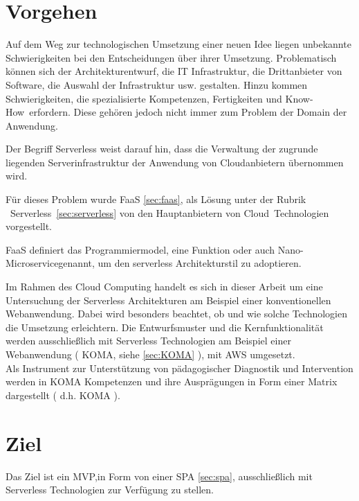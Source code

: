 \documentclass[
12pt,
english,
ngerman,
headsepline,
twoside,
openright,
numbers=noenddot,version=first
]{scrreprt}
\begin{document}
\section{Vorgehen}
Auf dem Weg zur technologischen Umsetzung einer neuen Idee liegen unbekannte Schwierigkeiten
bei den Entscheidungen über ihrer Umsetzung. Problematisch können sich der Architekturentwurf, die IT Infrastruktur, die Drittanbieter von Software, die Auswahl der Infrastruktur usw. gestalten. Hinzu kommen Schwierigkeiten, die spezialisierte Kompetenzen, Fertigkeiten und \glqq Know-How\grqq\ erfordern. Diese gehören jedoch nicht immer zum Problem der Domain der Anwendung.

Der Begriff Serverless weist darauf hin, dass die Verwaltung der zugrunde liegenden Serverinfrastruktur der Anwendung von Cloudanbietern übernommen wird. 

Für dieses Problem wurde \acrfull{FaaS} \autoref{sec:faas}, als Lösung unter der Rubrik \glqq\ Serverless\grqq\ \autoref{sec:serverless} von den Hauptanbietern von \glqq Cloud\grqq\ Technologien vorgestellt.

\acrshort{FaaS} definiert das Programmiermodel, eine Funktion oder auch \glqq Nano-Microservice\grqq genannt, um den serverless Architekturstil zu adoptieren.

Im Rahmen des Cloud Computing handelt es sich in dieser Arbeit um eine Untersuchung der Serverless Architekturen am Beispiel einer konventionellen Webanwendung. Dabei wird besonders beachtet, ob und wie solche Technologien die Umsetzung erleichtern. Die Entwurfsmuster und die Kernfunktionalität werden ausschließlich mit Serverless Technologien am Beispiel einer Webanwendung ( \acrfull{KOMA}, siehe \autoref{sec:KOMA} ), mit \acrshort{AWS} umgesetzt.\\
Als Instrument zur Unterstützung von pädagogischer Diagnostik und Intervention werden in \acrshort{KOMA} Kompetenzen und ihre Ausprägungen in Form einer Matrix dargestellt ( d.h. \acrshort{KOMA} ). 


\section{Ziel}
\label{sec:task}
Das Ziel ist ein \acrlong{MVP},in Form von einer \acrfull{SPA} \autoref{sec:spa}, ausschließlich mit Serverless Technologien zur Verfügung zu stellen.
\end{document}

